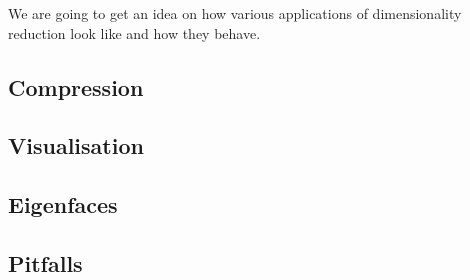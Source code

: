 We are going to get an idea on how various applications of dimensionality reduction look like and how they behave.


\subsection{Compression}

\clearpage



\subsection{Visualisation}

\clearpage


\subsection{Eigenfaces}

\clearpage

\subsection{Pitfalls}

\clearpage
